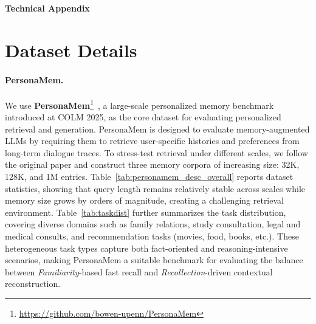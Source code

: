 \newpage
\appendix
\begin{center}
    \LARGE \textbf{Technical Appendix}
    \vspace{1em}
\end{center}

\begingroup
  \localtableofcontents                %
\endgroup
\clearpage

\appendix


\section{Dataset Details}
\label{app:dataset}
\paragraph{PersonaMem.} 
We use \textbf{PersonaMem}\footnote{\url{https://github.com/bowen-upenn/PersonaMem}}~\citep{jiang2025know}, a large-scale personalized memory benchmark introduced at COLM 2025, as the core dataset for evaluating personalized retrieval and generation.
PersonaMem is designed to evaluate memory-augmented LLMs by requiring them to retrieve user-specific histories and preferences from long-term dialogue traces. 
To stress-test retrieval under different scales, we follow the original paper and construct three memory corpora of increasing size: 32K, 128K, and 1M entries. 
Table~\ref{tab:personamem_desc_overall} reports dataset statistics, showing that query length remains relatively stable across scales while memory size grows by orders of magnitude, creating a challenging retrieval environment. 
Table~\ref{tab:taskdist} further summarizes the task distribution, covering diverse domains such as family relations, study consultation, legal and medical consults, and recommendation tasks (movies, food, books, etc.). 
These heterogeneous task types capture both fact-oriented and reasoning-intensive scenarios, making PersonaMem a suitable benchmark for evaluating the balance between \emph{Familiarity}-based fast recall and \emph{Recollection}-driven contextual reconstruction.


